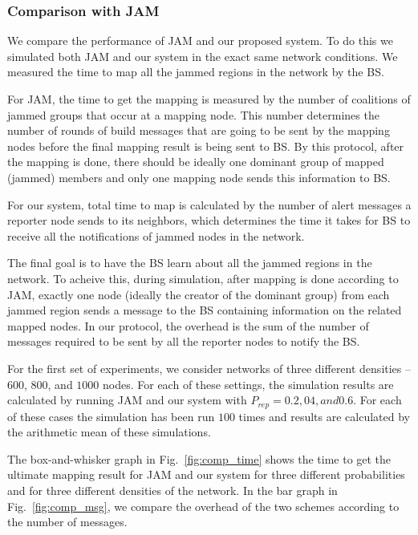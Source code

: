 \documentclass[conference]{IEEEtran}
\begin{document}
\subsubsection{Comparison with JAM} We compare the performance of JAM \cite{JAM} and our proposed system. To do this we simulated both JAM and our system in the exact same network conditions.
\newline
{} We measured the time to map all the jammed regions in the network by the BS. 

For JAM, the time to get the mapping is measured by the number of coalitions of jammed groups that occur at a mapping node. This number determines the number of rounds of build messages that are going to be sent by the mapping nodes before the final mapping result is being sent to BS. By this protocol, after the mapping is done, there should be ideally one dominant group of mapped (jammed) members and only one mapping node sends this information to BS.

For our system, total time to map is calculated by the number of alert messages a reporter node sends to its neighbors, which determines the time it takes for BS to receive all the notifications of jammed nodes in the network. \newline

The final goal is to have the BS learn about all the jammed regions in the network. To acheive this, during simulation, after mapping is done according to JAM, exactly one node (ideally the creator of the dominant group) from each jammed region sends a message to the BS containing information on the related mapped nodes. In our protocol, the overhead is the sum of the number of messages required to be sent by all the reporter nodes to notify the BS.

For the first set of experiments, we consider networks of three different densities -- $600$, $800$, and $1000$ nodes. For each of these settings, the simulation results are calculated by running JAM and our system with $P_{rep} = 0.2, 04, and 0.6$. For each of these cases the simulation has been run $100$ times and results are calculated by the arithmetic mean of these simulations. 

The box-and-whisker graph in Fig.~\ref{fig:comp_time} shows the time to get the ultimate mapping result for JAM and our system for three different probabilities and for three different densities of the network.
In the bar graph in Fig.~\ref{fig:comp_msg}, we compare the overhead of the two schemes according to the number of messages.
\end{document}
